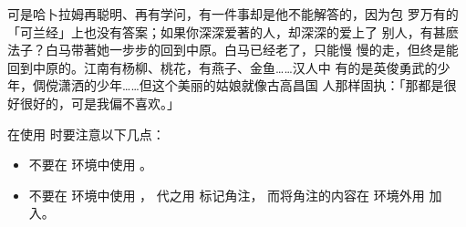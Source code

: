 \begin{figwindow}
	可是哈卜拉姆再聪明、再有学问，有一件事却是他不能解答的，因为包
	罗万有的「可兰经」上也没有答案；如果你深深爱著的人，却深深的爱上了
	别人，有甚麽法子？白马带著她一步步的回到中原。白马已经老了，只能慢
	慢的走，但终是能回到中原的。江南有杨柳、桃花，有燕子、金鱼……汉人中
	有的是英俊勇武的少年，倜傥潇洒的少年……但这个美丽的姑娘就像古高昌国
	人那样固执：「那都是很好很好的，可是我偏不喜欢。」
\end{figwindow}

在使用  时要注意以下几点：
\begin{itemize}
	\item 不要在  环境中使用 。
	\item 不要在  环境中使用 ，
	代之用  标记角注，
	而将角注的内容在  环境外用  加入。
\end{itemize}

\endinput
